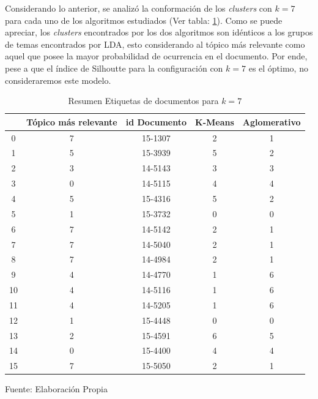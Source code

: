     Considerando lo anterior, se analizó la conformación de los \textit{clusters} con $k=7$ para cada uno de los algoritmos estudiados (Ver tabla: \ref{table:Cluster_Etiquetas}). Como se puede apreciar, los \textit{clusters} encontrados por los dos algoritmos son idénticos a los grupos de temas encontrados por LDA, esto considerando al tópico más relevante como aquel que posee la mayor probabilidad de ocurrencia en el documento. Por ende, pese a que el índice de Silhoutte para la configuración con $k=7$ es el óptimo, no consideraremos este modelo. 
    \begin{table}[H]
    \centering
\begin{tabular}{|c|c|c|c|c|}
\hline
   & Tópico más relevante & id Documento & K-Means & Aglomerativo \\ \hline
0  & 7                    & 15-1307      & 2       & 1            \\ \hline
1  & 5                    & 15-3939      & 5       & 2            \\ \hline
2  & 3                    & 14-5143      & 3       & 3            \\ \hline
3  & 0                    & 14-5115      & 4       & 4            \\ \hline
4  & 5                    & 15-4316      & 5       & 2            \\ \hline
5  & 1                    & 15-3732      & 0       & 0            \\ \hline
6  & 7                    & 14-5142      & 2       & 1            \\ \hline
7  & 7                    & 14-5040      & 2       & 1            \\ \hline
8  & 7                    & 14-4984      & 2       & 1            \\ \hline
9  & 4                    & 14-4770      & 1       & 6            \\ \hline
10 & 4                    & 14-5116      & 1       & 6            \\ \hline
11 & 4                    & 14-5205      & 1       & 6            \\ \hline
12 & 1                    & 15-4448      & 0       & 0            \\ \hline
13 & 2                    & 15-4591      & 6       & 5            \\ \hline
14 & 0                    & 15-4400      & 4       & 4            \\ \hline
15 & 7                    & 15-5050      & 2       & 1            \\ \hline
\end{tabular}
    \caption{\label{table:Cluster_Etiquetas} Resumen Etiquetas de documentos para $k=7$} Fuente: Elaboración Propia
\end{table}
    
